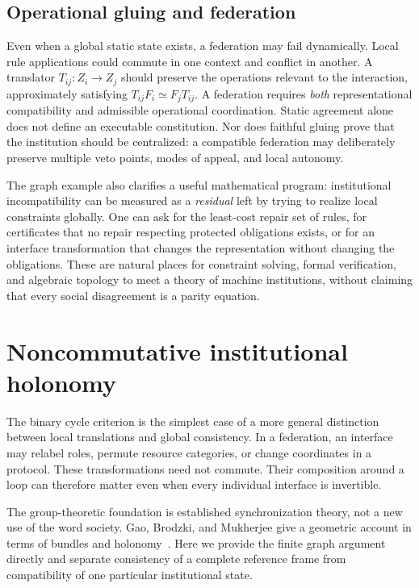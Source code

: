 \subsection{Operational gluing and federation}

Even when a global static state exists, a federation may fail dynamically. Local rule applications could commute in one context and conflict in another. A translator $T_{ij}:Z_i\to Z_j$ should preserve the operations relevant to the interaction, approximately satisfying $T_{ij}F_i\simeq F_jT_{ij}$. A federation requires \emph{both} representational compatibility and admissible operational coordination. Static agreement alone does not define an executable constitution. Nor does faithful gluing prove that the institution should be centralized: a compatible federation may deliberately preserve multiple veto points, modes of appeal, and local autonomy.

The graph example also clarifies a useful mathematical program: institutional incompatibility can be measured as a \emph{residual} left by trying to realize local constraints globally. One can ask for the least-cost repair set of rules, for certificates that no repair respecting protected obligations exists, or for an interface transformation that changes the representation without changing the obligations. These are natural places for constraint solving, formal verification, and algebraic topology to meet a theory of machine institutions, without claiming that every social disagreement is a parity equation.


\section{Noncommutative institutional holonomy}\label{MS:sec:holonomy}
The binary cycle criterion is the simplest case of a more general distinction between local translations and global consistency. In a federation, an interface may relabel roles, permute resource categories, or change coordinates in a protocol. These transformations need not commute. Their composition around a loop can therefore matter even when every individual interface is invertible.

The group-theoretic foundation is established synchronization theory, not a new use of the word society. Gao, Brodzki, and Mukherjee give a geometric account in terms of bundles and holonomy~\cite{MS:gaosync}. Here we provide the finite graph argument directly and separate consistency of a complete reference frame from compatibility of one particular institutional state.

